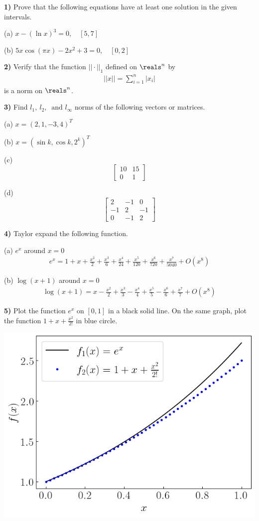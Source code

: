 \documentclass[12pt,a4paper]{article}
\newcommand{\prob}[2]{\textbf{#1)} #2}
\begin{document}
\prob{1}{Prove that the following equations have at least one solution in the given intervals.}

(a) $x - (\ln{x})^3 = 0,\quad [5,7]$

(b) $5x\cos(\pi x) - 2x^2 + 3 = 0,\quad [0,2]$

\prob{2}{Verify that the function $|| \cdot ||_1$ defined on $\reals^n$ by
\begin{align*}
||x|| = \sum_{i=1}^{n} |x_i|
\end{align*}
is a norm on $\reals^n$.}

\prob{3}{Find $l_1,~l_2,~\text{ and }l_{\infty}$ norms of the following vectors or matrices.}

(a) $x = (2,1,-3,4)^{T}$

(b) $x = (\sin{k},\cos{k},2^{k})^{T}$

(c) 
\[
\begin{bmatrix}
10 & 15 \\
0  & 1
\end{bmatrix}
\]

(d) 
\[
\begin{bmatrix}
2 & -1 & 0 \\
-1 & 2 & -1 \\
0 & -1 & 2
\end{bmatrix}
\]

\prob{4}{Taylor expand the following function.}

(a) $e^x$ around $x = 0$
\begin{align*}
e^{x} = 1 + x + \frac{x^{2}}{2} + \frac{x^{3}}{6} + \frac{x^{4}}{24} + \frac{x^{5}}{120} + \frac{x^{6}}{720} + \frac{x^{7}}{5040} + O\left(x^{8}\right)
\end{align*}

(b) $\log(x+1)$ around $x = 0$
\begin{align*}
\log(x+1) = x - \frac{x^{2}}{2} + \frac{x^{3}}{3} - \frac{x^{4}}{4} + \frac{x^{5}}{5} - \frac{x^{6}}{6} + \frac{x^{7}}{7} + O\left(x^{8}\right)
\end{align*}


\prob{5}{Plot the function $e^x$ on $[0,1]$ in a black solid line. On the same graph, plot the function $1+x+\frac{x^2}{2!}$ in blue circle.}

\bef
\includegraphics[scale=0.75]{prob5fig.png}
\eef

\end{document}
